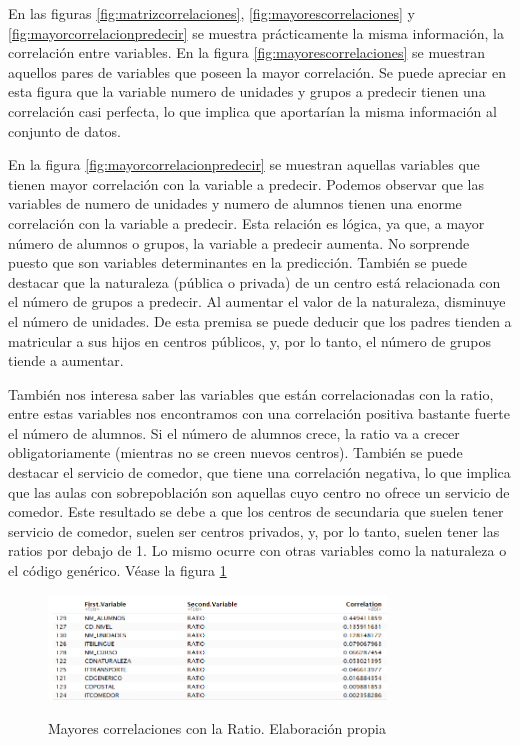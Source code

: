 En las figuras \ref{fig:matrizcorrelaciones}, \ref{fig:mayorescorrelaciones} y \ref{fig:mayorcorrelacionpredecir} se muestra prácticamente la misma información, la correlación entre variables. En la figura \ref{fig:mayorescorrelaciones} se muestran aquellos pares de variables que poseen la mayor correlación. Se puede apreciar en esta figura que la variable numero de unidades y grupos a predecir tienen una correlación casi perfecta, lo que implica que aportarían la misma información al conjunto de datos.

En la figura \ref{fig:mayorcorrelacionpredecir} se muestran aquellas variables que tienen mayor correlación con la variable a predecir. Podemos observar que las variables de numero de unidades y numero de alumnos tienen una enorme correlación con la variable a predecir. Esta relación es lógica, ya que, a mayor número de alumnos o grupos, la variable a predecir aumenta.  No sorprende puesto que son variables determinantes en la predicción. También se puede destacar que la naturaleza (pública o privada) de un centro está relacionada con el número de grupos a predecir. Al aumentar el valor de la naturaleza, disminuye el número de unidades. De esta premisa se puede deducir que los padres tienden a matricular a sus hijos en centros públicos, y, por lo tanto, el número de grupos tiende a aumentar. %

También nos interesa saber las variables que están correlacionadas con la ratio, entre estas variables nos encontramos con una correlación positiva bastante fuerte el número de alumnos. Si el número de alumnos crece, la ratio va a crecer obligatoriamente (mientras no se creen nuevos centros). También se puede destacar el servicio de comedor, que tiene una correlación negativa, lo que implica que las aulas con sobrepoblación son aquellas cuyo centro no ofrece un servicio de comedor. Este resultado se debe a que los centros de secundaria que suelen tener servicio de comedor, suelen ser centros privados, y, por lo tanto, suelen tener las ratios por debajo de 1. Lo mismo ocurre con otras variables como la naturaleza o el código genérico. Véase la figura \ref{fig:variablesRatio}

\begin{figure}[htb]
	\centering
	\caption{Mayores correlaciones con la Ratio. Elaboración propia}
	\includegraphics[width=0.8\textwidth]{recursos/ImagenesR/variablesRatio}
	\label{fig:variablesRatio}
\end{figure}
\FloatBarrier


